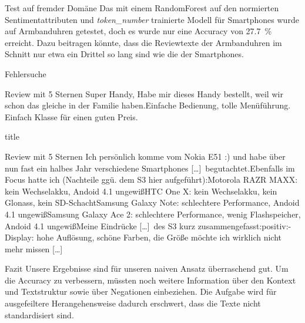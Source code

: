 \documentclass[note=hide]{beamer} %
\newcommand{\feature}[1]{\emph{#1}}
\newcommand{\ellipse}{[\ldots]}
\begin{document}
\begin{frame}{Test auf fremder Domäne}
	Das mit einem RandomForest auf den normierten Sentimentattributen und \feature{token\_number} trainierte Modell für Smartphones wurde auf Armbanduhren getestet, doch es wurde nur eine Accuracy von \SI{27.7}{\%} erreicht.
	Dazu beitragen könnte, dass die Reviewtexte der Armbanduhren im Schnitt nur etwa ein Drittel so lang sind wie die der Smartphones.
\end{frame}

\begin{frame}{Fehlersuche}
	\begin{block}{Review mit 5 Sternen}
		Super Handy, Habe mir dieses Handy bestellt, weil wir schon das gleiche in der Familie haben.Einfache Bedienung, tolle Menüführung. Einfach Klasse für einen guten Preis.
	\end{block}
\end{frame}

\begin{frame}{title}
	\begin{block}{Review mit 5 Sternen}
	Ich persönlich komme vom Nokia E51 :) und habe über nun fast ein halbes Jahr verschiedene Smartphones \ellipse\ begutachtet.Ebenfalls im Focus hatte ich (Nachteile ggü. dem S3 hier aufgeführt):Motorola RAZR MAXX: kein Wechselakku, Andoid 4.1 ungewißHTC One X: kein Wechselakku, kein Glonass, kein SD-SchachtSamsung Galaxy Note: schlechtere Performance, Andoid 4.1 ungewißSamsung Galaxy Ace 2: schlechtere Performance, wenig Flashspeicher, Andoid 4.1 ungewißMeine Eindrücke \ellipse\ des S3 kurz zusammengefasst:positiv:- Display: hohe Auflösung, schöne Farben, die Größe möchte ich wirklich nicht mehr missen \ellipse
	\end{block}
\end{frame}

\begin{frame}{Fazit}
	Unsere Ergebnisse sind für unseren naiven Ansatz überraschend gut.
	Um die Accuracy zu verbessern, müssten noch weitere Information über den Kontext und Textstruktur sowie über Negationen einbeziehen.
	Die Aufgabe wird für ausgefeiltere Herangehensweise dadurch erschwert, dass die Texte nicht standardisiert sind.
\end{frame}
\end{document}

